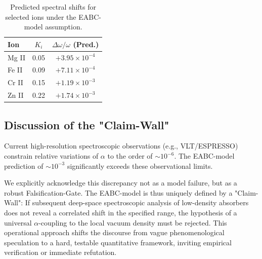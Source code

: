 \documentclass{article}
\begin{document}
	\begin{table}[h]
		\centering
		\begin{tabular}{|l|c|c|}
			\hline
			\textbf{Ion} & \textbf{$K_i$} & \textbf{$\Delta \omega / \omega$ (Pred.)} \\ \hline
			Mg II & 0.05 & $+3.95 \times 10^{-4}$ \\ \hline
			Fe II & 0.09 & $+7.11 \times 10^{-4}$ \\ \hline
			Cr II & 0.15 & $+1.19 \times 10^{-3}$ \\ \hline
			Zn II & 0.22 & $+1.74 \times 10^{-3}$ \\ \hline
		\end{tabular}
		\caption{Predicted spectral shifts for selected ions under the EABC-model assumption.}
	\end{table}
	
	\subsection{Discussion of the "Claim-Wall"}
	Current high-resolution spectroscopic observations (e.g., VLT/ESPRESSO) constrain relative variations of $\alpha$ to the order of $\sim 10^{-6}$. The EABC-model prediction of $\sim 10^{-3}$ significantly exceeds these observational limits.
	
	We explicitly acknowledge this discrepancy not as a model failure, but as a robust Falsification-Gate. The EABC-model is thus uniquely defined by a "Claim-Wall": If subsequent deep-space spectroscopic analysis of low-density absorbers does not reveal a correlated shift in the specified range, the hypothesis of a universal $\alpha$-coupling to the local vacuum density must be rejected. This operational approach shifts the discourse from vague phenomenological speculation to a hard, testable quantitative framework, inviting empirical verification or immediate refutation.
	
\end{document}
